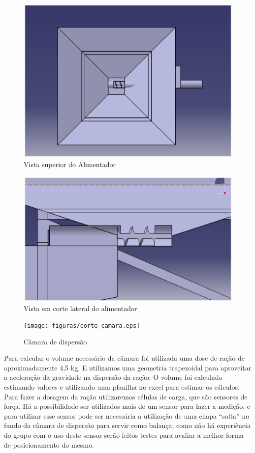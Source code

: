 \begin{figure}[H]
 \centering
   \includegraphics[keepaspectratio=true,scale=0.8]{figuras/vista_superior.eps}
 \caption{Vista superior do Alimentador}
 \label{vista_superior}
\end{figure}

\begin{figure}[H]
 \centering
   \includegraphics[keepaspectratio=true,scale=0.8]{figuras/corte_lateral.eps}
 \caption{Vista em corte lateral do alimentador}
 \label{corte_lateral}
\end{figure}

\begin{figure}[H]
 \centering
   \texttt{[image: figuras/corte\_camara.eps]}
 \caption{Câmara de dispersão}
 \label{corte_camara}
\end{figure}

Para calcular o volume necessário da câmara foi utilizada uma dose de ração de aproximadamente 4,5 kg. E utilizamos uma geometria trapezoidal para aproveitar a aceleração da gravidade na dispersão da ração. O volume foi calculado estimando valores e utilizando uma planilha no excel para estimar os cálculos. Para fazer a dosagem da ração utilizaremos células de carga, que são sensores de força. Há a possibilidade ser utilizados mais de um sensor para fazer a medição, e para utilizar esse sensor pode ser necessária a utilização de uma chapa “solta” no fundo da câmara de dispersão para servir como balança, como não há experiência do grupo com o uso deste sensor serão feitos testes para avaliar a melhor forma de posicionamento do mesmo.

